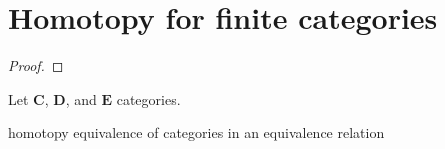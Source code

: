 \chapter{Homotopy for finite categories}

\begin{definition}
    
\end{definition}

\begin{definition}[Homotopy]
    
\end{definition}

\begin{theorem}
    
\end{theorem}

\begin{proof}
    
\end{proof}

\begin{definition}
    
\end{definition}

\begin{lemma}
    Let \(\mathbf{C}\), \(\mathbf{D}\), and \(\mathbf{E} \) categories.
\end{lemma}


\begin{definition}
    
\end{definition}

\begin{theorem}
    homotopy equivalence of categories in an equivalence relation
\end{theorem}


\section{}